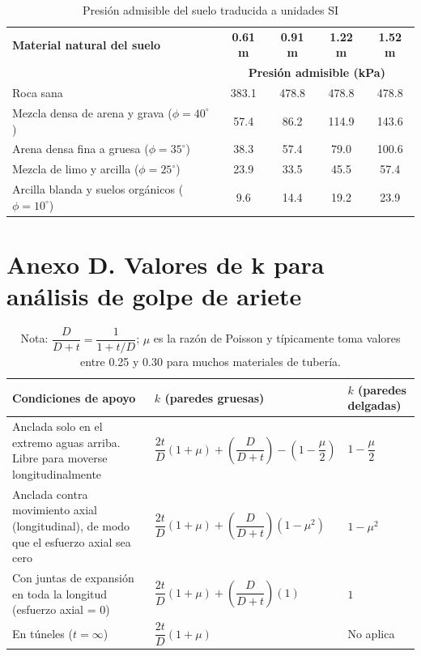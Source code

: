 \begin{table}[htbp]
\centering
\footnotesize
\caption{Presión admisible del suelo traducida a unidades SI}
\label{tab:presion-suelo}
\begin{tabular}{lcccc}
\toprule
\textbf{Material natural del suelo} & \textbf{0.61 m} & \textbf{0.91 m} & \textbf{1.22 m} & \textbf{1.52 m} \\
 & \multicolumn{4}{c}{\textbf{Presión admisible (kPa)}} \\
\midrule
Roca sana & 383.1 & 478.8 & 478.8 & 478.8 \\
Mezcla densa de arena y grava ($\phi = 40^\circ$) & 57.4 & 86.2 & 114.9 & 143.6 \\
Arena densa fina a gruesa ($\phi = 35^\circ$) & 38.3 & 57.4 & 79.0 & 100.6 \\
Mezcla de limo y arcilla ($\phi = 25^\circ$) & 23.9 & 33.5 & 45.5 & 57.4 \\
Arcilla blanda y suelos orgánicos ($\phi = 10^\circ$) & 9.6 & 14.4 & 19.2 & 23.9 \\
\bottomrule
\end{tabular}
\end{table}

\clearpage
\section*{Anexo D. Valores de k para análisis de golpe de ariete}

\begin{table}[htbp]
\centering
\footnotesize
\caption{Valores de $k$ tomados de mecánica de sólidos para el análisis de golpe de ariete}
\label{tab:k-golpe-ariete}
\begin{tabularx}{\textwidth}{>{\raggedright\arraybackslash}p{} >{\centering\arraybackslash}X >{\centering\arraybackslash}p{}}
\toprule
\textbf{Condiciones de apoyo} & \textbf{$k$ (paredes gruesas)} & \textbf{$k$ (paredes delgadas)} \\
\midrule
Anclada solo en el extremo aguas arriba. Libre para moverse longitudinalmente &
$\dfrac{2t}{D}(1+\mu)+\left(\dfrac{D}{D+t}\right)-\left(1-\dfrac{\mu}{2}\right)$ &
$1-\dfrac{\mu}{2}$ \\
Anclada contra movimiento axial (longitudinal), de modo que el esfuerzo axial sea cero &
$\dfrac{2t}{D}(1+\mu)+\left(\dfrac{D}{D+t}\right)(1-\mu^2)$ &
$1-\mu^2$ \\
Con juntas de expansión en toda la longitud (esfuerzo axial = 0) &
$\dfrac{2t}{D}(1+\mu)+\left(\dfrac{D}{D+t}\right)(1)$ &
$1$ \\
En túneles ($t=\infty$) &
$\dfrac{2t}{D}(1+\mu)$ &
No aplica \\
\bottomrule
\end{tabularx}
\caption*{\footnotesize Nota: $\dfrac{D}{D+t}= \dfrac{1}{1+t/D}$; $\mu$ es la razón de Poisson y típicamente toma valores entre 0.25 y 0.30 para muchos materiales de tubería.}
\end{table}

